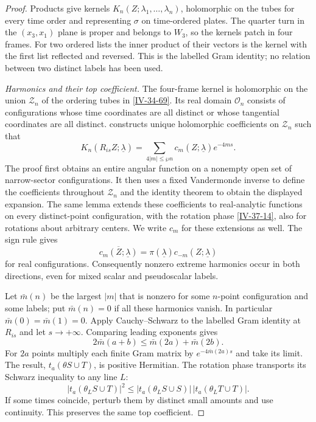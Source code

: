 \documentclass[11pt,letterpaper,reqno]{amsart}
\theoremstyle{definition}
\theoremstyle{remark}
\begin{document}
\begin{proof}
Products give kernels
$K_n(Z;\lambda_1,\ldots,\lambda_n)$, holomorphic on
the tubes for every time order and representing
$\sigma$ on time-ordered plates.  The quarter turn
in the $(x_3,x_1)$ plane is proper and belongs to
$W_3$, so the kernels patch in four frames.
For two ordered lists the inner product of their
vectors is the kernel with the first list reflected
and reversed.  This is the labelled Gram identity;
no relation between two distinct labels has been used.

\emph{Harmonics and their top coefficient.}
The four-frame kernel is holomorphic on the union
$\mathcal Z_n$ of the ordering tubes in \eqref{IV-34-69}.
Its real domain $\mathcal O_n$ consists of configurations
whose time coordinates are all distinct or whose tangential
coordinates are all distinct.  constructs
unique holomorphic coefficients on $\mathcal Z_n$ such that
\[
 K_n(R_{is}Z;\underline\lambda)
       =\sum_{4|m|\le\wp n}c_m(Z;\underline\lambda)e^{-4ms}.
\]
The proof first obtains an entire angular function on a
nonempty open set of narrow-sector configurations. It then
uses a fixed Vandermonde inverse to define the coefficients
throughout $\mathcal Z_n$ and the identity theorem to obtain
the displayed expansion. The same lemma extends these
coefficients to real-analytic functions on every
distinct-point configuration, with the rotation phase
\eqref{IV-37-14}, also for rotations about arbitrary centers.
We write $c_m$ for these extensions as well. The sign rule gives
\[
 \overline{c_m(Z;\underline\lambda)}
                  =\pi(\underline\lambda)c_{-m}(Z;\underline\lambda)
\]
for real configurations.
Consequently nonzero extreme harmonics occur in both
directions, even for mixed scalar and pseudoscalar labels.

Let $\bar m(n)$ be the largest $|m|$ that is nonzero
for some $n$-point configuration and some labels;
put $\bar m(n)=0$ if all these harmonics vanish.
In particular $\bar m(0)=\bar m(1)=0$.
Apply Cauchy--Schwarz to the labelled Gram identity
at $R_{is}$ and let $s\to+\infty$.  Comparing leading
exponents gives
\[
 2\bar m(a+b)\le\bar m(2a)+\bar m(2b).
\]
For $2a$ points multiply each finite Gram matrix by
$e^{-4\bar m(2a)s}$ and take its limit.  The result,
$t_a(\theta S\cup T)$, is positive Hermitian.
The rotation phase transports its Schwarz inequality
to any line $L$:
\[
 |t_a(\theta_LS\cup T)|^2\le
 |t_a(\theta_LS\cup S)|\,
 |t_a(\theta_LT\cup T)|.
\]
If some times coincide, perturb them by distinct
small amounts and use continuity.  This preserves
the same top coefficient.


\end{proof}
\end{document}
